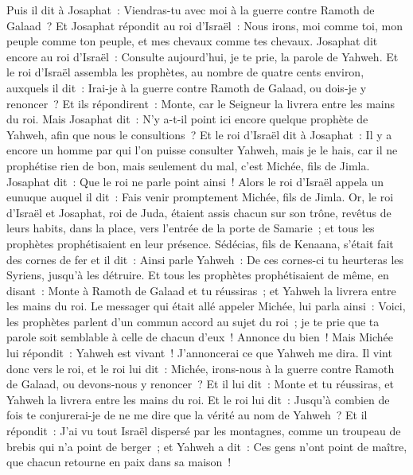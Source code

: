 \begin{multicols}{2}
Puis il dit à Josaphat~: Viendras-tu avec moi à la guerre contre Ramoth de Galaad~? Et Josaphat répondit au roi d'Israël~: Nous irons, moi comme toi, mon peuple comme ton peuple, et mes chevaux comme tes chevaux.
Josaphat dit encore au roi d'Israël~: Consulte aujourd'hui, je te prie, la parole de Yahweh.
Et le roi d'Israël assembla les prophètes, au nombre de quatre cents environ, auxquels il dit~: Irai-je à la guerre contre Ramoth de Galaad, ou dois-je y renoncer~? Et ils répondirent~: Monte, car le Seigneur la livrera entre les mains du roi.
Mais Josaphat dit~: N'y a-t-il point ici encore quelque prophète de Yahweh, afin que nous le consultions~?
Et le roi d'Israël dit à Josaphat~: Il y a encore un homme par qui l'on puisse consulter Yahweh, mais je le hais, car il ne prophétise rien de bon, mais seulement du mal, c'est Michée, fils de Jimla. Josaphat dit~: Que le roi ne parle point ainsi~!
Alors le roi d'Israël appela un eunuque auquel il dit~: Fais venir promptement Michée, fils de Jimla.
Or, le roi d'Israël et Josaphat, roi de Juda, étaient assis chacun sur son trône, revêtus de leurs habits, dans la place, vers l'entrée de la porte de Samarie~; et tous les prophètes prophétisaient en leur présence.
Sédécias, fils de Kenaana, s'était fait des cornes de fer et il dit~: Ainsi parle Yahweh~: De ces cornes-ci tu heurteras les Syriens, jusqu'à les détruire.
Et tous les prophètes prophétisaient de même, en disant~: Monte à Ramoth de Galaad et tu réussiras~; et Yahweh la livrera entre les mains du roi.
Le messager qui était allé appeler Michée, lui parla ainsi~: Voici, les prophètes parlent d'un commun accord au sujet du roi~; je te prie que ta parole soit semblable à celle de chacun d'eux~! Annonce du bien~!
Mais Michée lui répondit~: Yahweh est vivant~! J'annoncerai ce que Yahweh me dira.
Il vint donc vers le roi, et le roi lui dit~: Michée, irons-nous à la guerre contre Ramoth de Galaad, ou devons-nous y renoncer~? Et il lui dit~: Monte et tu réussiras, et Yahweh la livrera entre les mains du roi.
Et le roi lui dit~: Jusqu'à combien de fois te conjurerai-je de ne me dire que la vérité au nom de Yahweh~?
Et il répondit~: J'ai vu tout Israël dispersé par les montagnes, comme un troupeau de brebis qui n'a point de berger~; et Yahweh a dit~: Ces gens n'ont point de maître, que chacun retourne en paix dans sa maison~!

\end{multicols}
